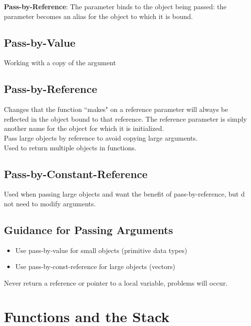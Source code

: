 \documentclass{article}
\begin{document}
	\textbf{Pass-by-Reference}: The parameter binds to the object being passed: the parameter becomes an alias for the object to which it is bound.
	
	\subsection{Pass-by-Value}
	
	Working with a copy of the argument
	
	\subsection{Pass-by-Reference}
	
	Changes that the function ``makes" on a reference parameter will always be reflected in the object bound to that reference. The reference parameter is simply another name for the object for which it is initialized.\\
	
	Pass large objects by reference to avoid copying large arguments.\\
	
	Used to return multiple objects in functions.
	
	\subsection{Pass-by-Constant-Reference}
	
	Used when passing large objects and want the benefit of pass-by-reference, but d not need to modify arguments.
	
	\subsection{Guidance for Passing Arguments}
	
	\begin{itemize}
		\item Use pass-by-value for small objects (primitive data types)
		\item Use pass-by-const-reference for large objects (vectors)
	\end{itemize}

	Never return a reference or pointer to a local variable, problems will occur.
	
	\section{Functions and the Stack}
	
\end{document}
